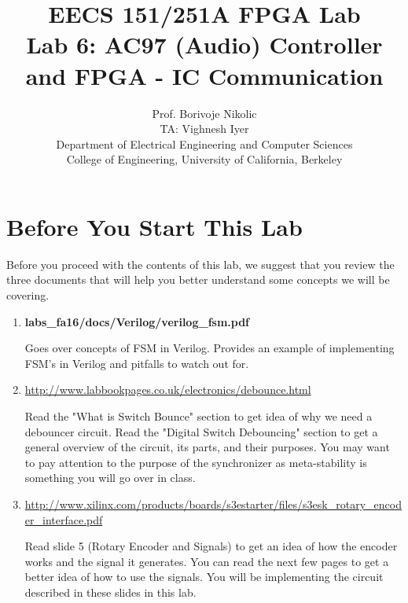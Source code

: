\documentclass[11pt]{article}
\begin{document}
\title{EECS 151/251A FPGA Lab\\
Lab 6: AC97 (Audio) Controller and FPGA - IC Communication}

\author{Prof. Borivoje Nikolic \\
TA: Vighnesh Iyer \\Department of Electrical Engineering and Computer Sciences\\
College of Engineering, University of California, Berkeley}
\date{}
\maketitle

\tableofcontents

\section{Before You Start This Lab}

Before you proceed with the contents of this lab, we suggest that you review the three documents that will help you better understand some concepts we will be covering.

\begin{enumerate}
	\item \textbf{labs\_fa16/docs/Verilog/verilog\_fsm.pdf}
	
	Goes over concepts of FSM in Verilog. Provides an example of  implementing FSM's in Verilog and pitfalls to watch out for.
	
	\item \url{http://www.labbookpages.co.uk/electronics/debounce.html}
	
	Read the "What is Switch Bounce" section to get idea of why we need a debouncer circuit. Read the "Digital Switch Debouncing" section to get a general overview of the circuit, its parts, and their purposes. You may want to pay attention to the purpose of the synchronizer as meta-stability is something you will go over in class.
	
	\item \url{http://www.xilinx.com/products/boards/s3estarter/files/s3esk_rotary_encoder_interface.pdf}
	
	Read slide 5 (Rotary Encoder and Signals) to get an idea of how the encoder works and the signal it generates. You can read the next few pages to get a better idea of how to use the signals. You will be implementing the circuit described in these slides in this lab.

\end{enumerate}
\end{document}
